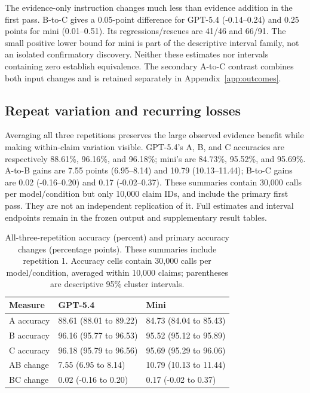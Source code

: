 \documentclass[11pt,letterpaper]{article}
\begin{document}
The evidence-only instruction changes much less than evidence addition in the first pass. B-to-C gives a 0.05-point difference for GPT-5.4 (-0.14--0.24) and 0.25 points for mini (0.01--0.51). Its regressions/rescues are 41/46 and 66/91. The small positive lower bound for mini is part of the descriptive interval family, not an isolated confirmatory discovery. Neither these estimates nor intervals containing zero establish equivalence. The secondary A-to-C contrast combines both input changes and is retained separately in Appendix~\ref{app:outcomes}.

\subsection{Repeat variation and recurring losses}\label{sec:variation}
Averaging all three repetitions preserves the large observed evidence benefit while making within-claim variation visible. GPT-5.4's A, B, and C accuracies are respectively 88.61\%, 96.16\%, and 96.18\%; mini's are 84.73\%, 95.52\%, and 95.69\%. A-to-B gains are 7.55 points (6.95--8.14) and 10.79 (10.13--11.44); B-to-C gains are 0.02 (-0.16--0.20) and 0.17 (-0.02--0.37). These summaries contain 30,000 calls per model/condition but only 10,000 claim IDs, and include the primary first pass. They are not an independent replication of it. Full estimates and interval endpoints remain in the frozen output and supplementary result tables.

\begin{table}[htbp]\centering\small
\caption{All-three-repetition accuracy (percent) and primary accuracy changes (percentage points). These summaries include repetition 1. Accuracy cells contain 30,000 calls per model/condition, averaged within 10,000 claims; parentheses are descriptive 95\% cluster intervals.}\label{tab:repeat}
\begin{tabularx}{\linewidth}{lXX}\toprule
Measure & GPT-5.4 & Mini \\\midrule
A accuracy & 88.61 (88.01 to 89.22) & 84.73 (84.04 to 85.43) \\
B accuracy & 96.16 (95.77 to 96.53) & 95.52 (95.12 to 95.89) \\
C accuracy & 96.18 (95.79 to 96.56) & 95.69 (95.29 to 96.06) \\
AB change & 7.55 (6.95 to 8.14) & 10.79 (10.13 to 11.44) \\
BC change & 0.02 (-0.16 to 0.20) & 0.17 (-0.02 to 0.37) \\
\bottomrule
\end{tabularx}
\end{table}
\end{document}
